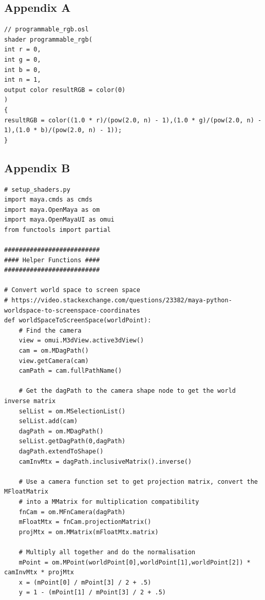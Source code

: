 \documentclass[conference]{IEEEtran}
\begin{document}
\begin{center}
\section*{Appendix A}
\label{app:a}
\end{center}

\footnotesize{
\begin{verbatim}
// programmable_rgb.osl
shader programmable_rgb(
int r = 0,
int g = 0,
int b = 0,
int n = 1,
output color resultRGB = color(0)
)
{
resultRGB = color((1.0 * r)/(pow(2.0, n) - 1),(1.0 * g)/(pow(2.0, n) - 1),(1.0 * b)/(pow(2.0, n) - 1));
}
\end{verbatim}

\bigskip

\begin{center}
\section*{Appendix B}
\label{app:b}
\end{center}

\footnotesize{
\begin{verbatim}
# setup_shaders.py
import maya.cmds as cmds
import maya.OpenMaya as om
import maya.OpenMayaUI as omui
from functools import partial

##########################
#### Helper Functions ####
##########################

# Convert world space to screen space
# https://video.stackexchange.com/questions/23382/maya-python-worldspace-to-screenspace-coordinates
def worldSpaceToScreenSpace(worldPoint):
    # Find the camera
    view = omui.M3dView.active3dView()
    cam = om.MDagPath()
    view.getCamera(cam)
    camPath = cam.fullPathName()
    
    # Get the dagPath to the camera shape node to get the world inverse matrix
    selList = om.MSelectionList()
    selList.add(cam)
    dagPath = om.MDagPath()
    selList.getDagPath(0,dagPath)
    dagPath.extendToShape()
    camInvMtx = dagPath.inclusiveMatrix().inverse()

    # Use a camera function set to get projection matrix, convert the MFloatMatrix 
    # into a MMatrix for multiplication compatibility
    fnCam = om.MFnCamera(dagPath)
    mFloatMtx = fnCam.projectionMatrix()
    projMtx = om.MMatrix(mFloatMtx.matrix)

    # Multiply all together and do the normalisation
    mPoint = om.MPoint(worldPoint[0],worldPoint[1],worldPoint[2]) * camInvMtx * projMtx
    x = (mPoint[0] / mPoint[3] / 2 + .5)
    y = 1 - (mPoint[1] / mPoint[3] / 2 + .5)
    

\end{verbatim}}}
\end{document}
